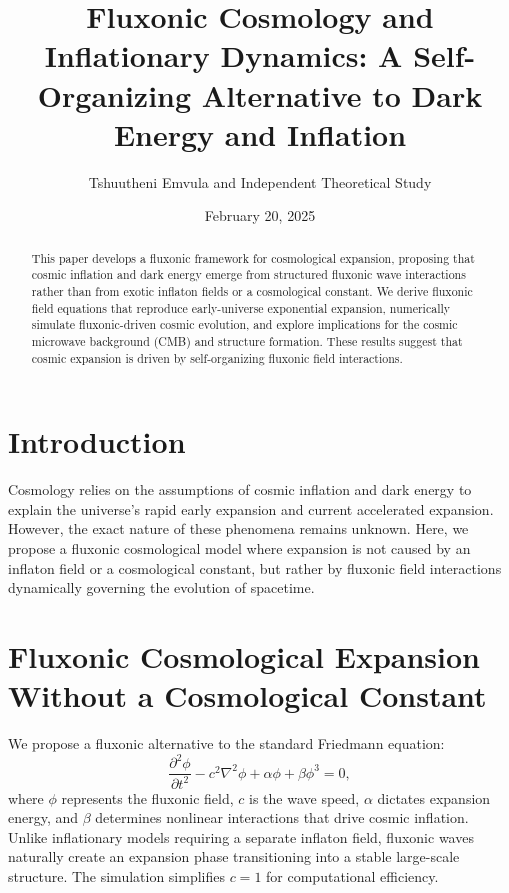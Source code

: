 \documentclass{article}
\title{Fluxonic Cosmology and Inflationary Dynamics: A Self-Organizing Alternative to Dark Energy and Inflation}
\author{Tshuutheni Emvula and Independent Theoretical Study}
\date{February 20, 2025}
\begin{document}
\maketitle

\begin{abstract}
This paper develops a fluxonic framework for cosmological expansion, proposing that cosmic inflation and dark energy emerge from structured fluxonic wave interactions rather than from exotic inflaton fields or a cosmological constant. We derive fluxonic field equations that reproduce early-universe exponential expansion, numerically simulate fluxonic-driven cosmic evolution, and explore implications for the cosmic microwave background (CMB) and structure formation. These results suggest that cosmic expansion is driven by self-organizing fluxonic field interactions.
\end{abstract}

\section{Introduction}
Cosmology relies on the assumptions of cosmic inflation and dark energy to explain the universe’s rapid early expansion and current accelerated expansion. However, the exact nature of these phenomena remains unknown. Here, we propose a fluxonic cosmological model where expansion is not caused by an inflaton field or a cosmological constant, but rather by fluxonic field interactions dynamically governing the evolution of spacetime.

\section{Fluxonic Cosmological Expansion Without a Cosmological Constant}
We propose a fluxonic alternative to the standard Friedmann equation:
\begin{equation}
    \frac{\partial^2 \phi}{\partial t^2} - c^2 \nabla^2 \phi + \alpha \phi + \beta \phi^3 = 0,
\end{equation}
where \(\phi\) represents the fluxonic field, \(c\) is the wave speed, \(\alpha\) dictates expansion energy, and \(\beta\) determines nonlinear interactions that drive cosmic inflation. Unlike inflationary models requiring a separate inflaton field, fluxonic waves naturally create an expansion phase transitioning into a stable large-scale structure. The simulation simplifies \(c = 1\) for computational efficiency.
\end{document}

